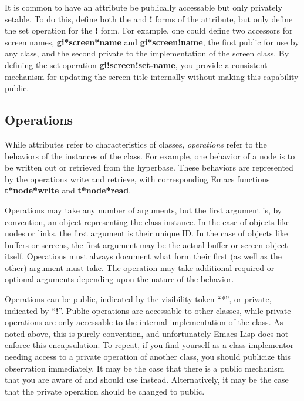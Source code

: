 It is common to have an attribute be publically accessable but only
privately setable.  To do this, define both the {\bf *} and {\bf !}
forms of the attribute, but only define the set operation for the {\bf
!} form. For example, one could define two accessors for screen names,
{\bf gi*screen*name} and {\bf gi*screen!name}, the first public for use
by any class, and the second private to the implementation of the
screen class.  By defining the set operation {\bf gi!screen!set-name},
you provide a consistent mechanism for updating the screen title
internally without making this capability public.

\subsection{Operations}

While attributes refer to characteristics of classes, {\em operations}
refer to the behaviors of the instances of the class.  For example,
one behavior of a node is to be written out or retrieved from the
hyperbase.  These behaviors are represented by the operations
{\sf write} and {\sf retrieve}, with corresponding Emacs functions {\bf
t*node*write} and {\bf t*node*read}.

Operations may take any number of arguments, but the first argument
is, by convention, an object representing the class instance.  In the
case of objects like nodes or links, the first argument is their
unique ID.  In the case of objects like buffers or screens, the first
argument may be the actual buffer or screen object itself.  Operations
must always document what form their first (as well as the other)
argument must take. The operation may take additional required or
optional arguments depending upon the nature of the behavior.


Operations can be public, indicated by the visibility token ``*'',
or private, indicated by ``{\bf !}''.  Public operations are accessable to
other classes, while private operations are only accessable to the
internal implementation of the class. As noted above, this is purely
convention, and unfortunately Emacs Lisp does not enforce this
encapsulation.  To repeat, if you find yourself as a class implementor
needing access to a private operation of another class, you should
publicize this observation immediately.  It may be the case that there
is a public mechanism that you are aware of and should use instead.
Alternatively, it may be the case that the private operation should be
changed to public.

